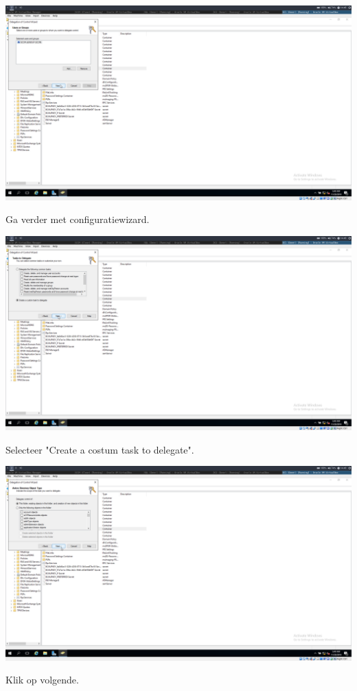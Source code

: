\documentclass[a4paper]{article}
\begin{document}
\begin{center}
	\includegraphics[width=15cm]{Pictures/SCCM/1/1543499336.png}
	
	Ga verder met configuratiewizard.
\end{center}
\begin{center}
	\includegraphics[width=15cm]{Pictures/SCCM/1/1543499340.png}
	
	Selecteer "Create a costum task to delegate".
\end{center}
\begin{center}
	\includegraphics[width=15cm]{Pictures/SCCM/1/1543499344.png}
	
	Klik op volgende.
\end{center}
\end{document}
